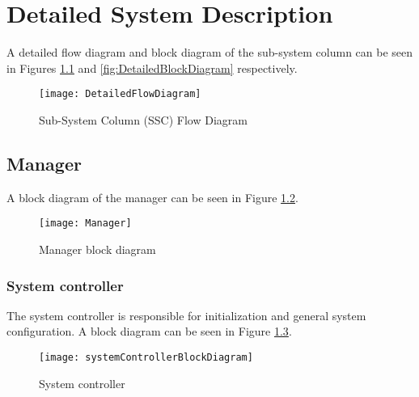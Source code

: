 

\chapter{Detailed System Description}
\label{sec:Detailed System Description}

A detailed flow diagram and block diagram of the sub-system column can be seen in Figures \ref{fig:DetailedFlowDiagram} and \ref{fig:DetailedBlockDiagram} respectively.
\begin{figure}[h]
\centering
\captionsetup{justification=centering}
\captionsetup{width=.9\linewidth}
\centerline{
\mbox{\texttt{[image: DetailedFlowDiagram]}}
}
\center\caption{Sub-System Column (SSC) Flow Diagram}
\label{fig:DetailedFlowDiagram}
\end{figure}

\section{Manager}
\label{sec:manager}

A block diagram of the manager can be seen in Figure \ref{fig:Manager block diagram}.
\begin{figure}[h]
\centering
\captionsetup{justification=centering}
\captionsetup{width=.9\linewidth}
\centerline{
\mbox{\texttt{[image: Manager]}}
}
\center\caption{Manager block diagram}
\label{fig:Manager block diagram}
\end{figure}

\subsection{System controller}
\label{sec:System controller}

The system controller is responsible for initialization and general system configuration.
A block diagram can be seen in Figure \ref{fig:System controller}.

\begin{figure}[h]
\centering
\captionsetup{justification=centering}
\captionsetup{width=.9\linewidth}
\centerline{
\mbox{\texttt{[image: systemControllerBlockDiagram]}}
}
\center\caption{System controller}
\label{fig:System controller}
\end{figure}

